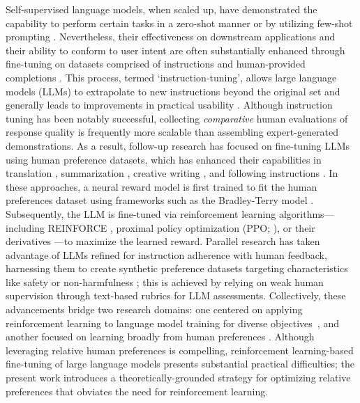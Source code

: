 Self-supervised language models, when scaled up, have demonstrated the capability to perform certain tasks in a zero-shot manner \citep{radford2019language} or by utilizing few-shot prompting \citep{gpt3,megatron,chowdhery2022palm}. Nevertheless, their effectiveness on downstream applications and their ability to conform to user intent are often substantially enhanced through fine-tuning on datasets comprised of instructions and human-provided completions \citep{mishra-etal-2022-cross,sanh2022multitask,chung2022scaling,thoppilan2022lamda}. This process, termed ‘instruction-tuning’, allows large language models (LLMs) to extrapolate to new instructions beyond the original set and generally leads to improvements in practical usability \citep{chung2022scaling}. Although instruction tuning has been notably successful, collecting \textit{comparative} human evaluations of response quality is frequently more scalable than assembling expert-generated demonstrations. As a result, follow-up research has focused on fine-tuning LLMs using human preference datasets, which has enhanced their capabilities in translation \citep{kreutzer-etal-2018-reliability}, summarization \citep{stiennon2022learning,ziegler2020finetuning}, creative writing \citep{ziegler2020finetuning}, and following instructions \citep{ouyang2022training,ramamurthy2023is}. In these approaches, a neural reward model is first trained to fit the human preferences dataset using frameworks such as the Bradley-Terry model \citep{bradley1952rankanalysis}. Subsequently, the LLM is fine-tuned via reinforcement learning algorithms—including REINFORCE \citep{williams1992reinforce}, proximal policy optimization (PPO; \cite{schulman2017proximal}), or their derivatives \citep{ramamurthy2023is}—to maximize the learned reward. Parallel research has taken advantage of LLMs refined for instruction adherence with human feedback, harnessing them to create synthetic preference datasets targeting characteristics like safety or non-harmfulness \citep{bai2022constitutional}; this is achieved by relying on weak human supervision through text-based rubrics for LLM assessments. Collectively, these advancements bridge two research domains: one centered on applying reinforcement learning to language model training for diverse objectives~\citep{Ranzato2015SequenceLT,paulus2018a,wu2018learning}, and another focused on learning broadly from human preferences \citep{christiano2017deep,kupcsik2018learning}. Although leveraging relative human preferences is compelling, reinforcement learning-based fine-tuning of large language models presents substantial practical difficulties; the present work introduces a theoretically-grounded strategy for optimizing relative preferences that obviates the need for reinforcement learning.


